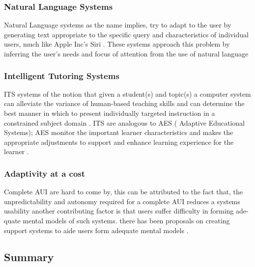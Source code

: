 \subsubsection{Natural Language Systems}
Natural Language systems as the name implies, try to adapt to the user by generating text appropriate to the specific query and characteristics of individual users, much like Apple Inc's Siri \cite{website:SIRI}. These systems approach this problem by inferring the user's needs and focus of attention from the use of natural language \cite{benyon1993adaptive}
\subsubsection{Intelligent Tutoring Systems}
ITS systems of the notion that given a student(s) and topic(s) a computer system can alleviate the variance of human-based teaching skills and can determine the best manner in which to present individually targeted instruction in a constrained subject domain \cite{benyon1993adaptive}. ITS are analogous to AES ( Adaptive Educational Systems); AES monitor the important learner characteristics and makes the appropriate adjustments to support and enhance learning experience for the learner \cite{shute2012adaptive}.
\subsubsection{Adaptivity at a cost}
Complete AUI are hard to come by, this can be attributed to the fact that, the unpredictability and autonomy required for a complete AUI reduces a systems usability another contributing factor is that users suffer difficulty in forming ade- quate mental models of such systems. there has been proposals on creating support systems to aide users form adequate mental models \cite{paymans2004usability}.
\subsection{Summary}

